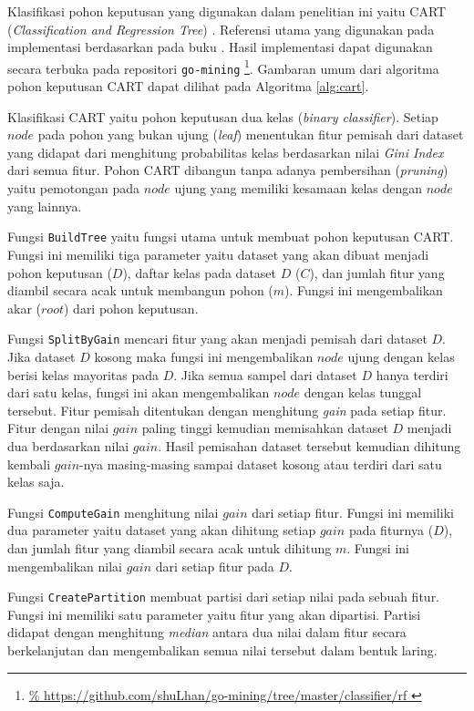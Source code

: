 Klasifikasi pohon keputusan yang digunakan dalam penelitian ini yaitu CART
(\textit{Classification and Regression Tree})
\parencite{breiman1984classification}.
Referensi utama yang digunakan pada implementasi berdasarkan pada buku
\textcite{han2011data}.
Hasil implementasi dapat digunakan secara terbuka pada repositori
\texttt{go-mining}%
\footnote{%
	\url{%
	https://github.com/shuLhan/go-mining/tree/master/classifier/rf
}}.
Gambaran umum dari algoritma pohon keputusan CART dapat dilihat pada Algoritma
\ref{alg:cart}.

Klasifikasi CART yaitu pohon keputusan dua kelas (\textit{binary classifier}).
Setiap $node$ pada pohon yang bukan ujung (\textit{leaf}) menentukan fitur
pemisah dari dataset yang didapat dari menghitung probabilitas kelas
berdasarkan nilai \textit{Gini Index} dari semua fitur.
Pohon CART dibangun tanpa adanya pembersihan (\textit{pruning}) yaitu
pemotongan pada $node$ ujung yang memiliki kesamaan kelas dengan $node$ yang
lainnya.

	

Fungsi \texttt{BuildTree} yaitu fungsi utama untuk membuat pohon keputusan CART.
Fungsi ini memiliki tiga parameter yaitu dataset yang akan dibuat
menjadi pohon keputusan ($D$), daftar kelas pada dataset $D$ ($C$), dan jumlah
fitur yang diambil secara acak untuk membangun pohon ($m$).
Fungsi ini mengembalikan akar ($root$) dari pohon keputusan.

Fungsi \texttt{SplitByGain} mencari fitur yang akan menjadi pemisah dari dataset
$D$.
Jika dataset $D$ kosong maka fungsi ini mengembalikan $node$ ujung dengan kelas
berisi kelas mayoritas pada $D$.
Jika semua sampel dari dataset $D$ hanya terdiri dari satu kelas, fungsi ini
akan mengembalikan $node$ dengan kelas tunggal tersebut.
Fitur pemisah ditentukan dengan menghitung \textit{gain} pada setiap fitur.
Fitur dengan nilai $gain$ paling tinggi kemudian memisahkan dataset $D$ menjadi
dua berdasarkan nilai $gain$.
Hasil pemisahan dataset tersebut kemudian dihitung kembali $gain$-nya
masing-masing sampai dataset kosong atau terdiri dari satu kelas saja.

Fungsi \texttt{ComputeGain} menghitung nilai $gain$ dari setiap fitur.
Fungsi ini memiliki dua parameter yaitu dataset yang akan dihitung setiap
$gain$ pada fiturnya ($D$), dan jumlah fitur yang diambil secara acak untuk
dihitung $m$.
Fungsi ini mengembalikan nilai $gain$ dari setiap fitur pada $D$.

Fungsi \texttt{CreatePartition} membuat partisi dari setiap nilai pada sebuah
fitur.
Fungsi ini memiliki satu parameter yaitu fitur yang akan dipartisi.
Partisi didapat dengan menghitung \textit{median} antara dua nilai dalam fitur
secara berkelanjutan dan mengembalikan semua nilai tersebut dalam bentuk
laring.

